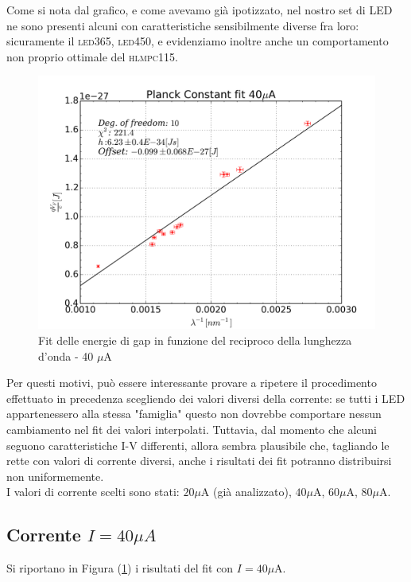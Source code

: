 \documentclass[journal, a4paper]{IEEEtran}
\begin{document}
Come si nota dal grafico, e come avevamo già ipotizzato, nel nostro set di LED ne sono presenti alcuni con caratteristiche sensibilmente diverse fra loro: sicuramente il \textsc{led365}, \textsc{led450}, e evidenziamo inoltre anche un comportamento non proprio ottimale del \textsc{hlmpc115}.\\

\begin{figure}[h]
\centering
\includegraphics[width=0.9\linewidth]{./costante_planck_40ua}
\caption{Fit delle energie di gap in funzione del reciproco della lunghezza d'onda - 40 $\mu$A}
\label{fig:costante_planck_40ua}
\end{figure}

Per questi motivi, può essere interessante provare a ripetere il procedimento effettuato in precedenza scegliendo dei valori diversi della corrente: se tutti i LED appartenessero alla stessa "famiglia" questo non dovrebbe comportare nessun cambiamento nel fit dei valori interpolati. Tuttavia, dal momento che alcuni seguono caratteristiche I-V differenti, allora sembra plausibile che, tagliando le rette con valori di corrente diversi, anche i risultati dei fit potranno distribuirsi non uniformemente.\\

I valori di corrente scelti sono stati: $20 \mu $A (già analizzato), $40 \mu $A, $60 \mu $A, $80 \mu $A.

\subsection{Corrente $I = 40 \mu \si{A}$}

Si riportano in Figura (\ref{fig:costante_planck_40ua}) i risultati del fit con $I = 40 \mu $A.
\end{document}
